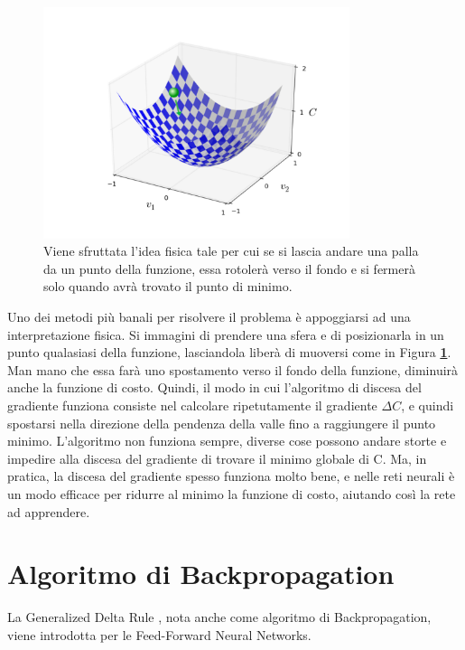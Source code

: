 \begin{figure}
\includegraphics[width=%
0.8\textwidth]{figures/valley_with_ball}
\caption[Funzione a forma di "valle": Idea di minimizzazione]{Viene sfruttata l'idea fisica tale per cui se si lascia andare una palla da un punto della funzione, essa rotolerà verso il fondo e si fermerà solo quando avrà trovato il punto di minimo.
\label{fig:vallepalla}}
\end{figure} 

Uno dei metodi più banali per risolvere il problema è appoggiarsi ad una interpretazione fisica. Si immagini di prendere una sfera e di posizionarla in un punto qualasiasi della funzione, lasciandola liberà di muoversi come in Figura \textbf{\ref{fig:vallepalla}}. Man mano che essa farà uno spostamento verso il fondo della funzione, diminuirà anche la funzione di costo.
Quindi, il modo in cui l'algoritmo di discesa del gradiente funziona consiste nel calcolare ripetutamente il gradiente $\Delta C$, e quindi spostarsi nella direzione della pendenza della valle fino a raggiungere il punto minimo.
L'algoritmo non funziona sempre, diverse cose possono andare storte e impedire alla discesa del gradiente di trovare il minimo globale di C. Ma, in pratica, la discesa del gradiente spesso funziona molto bene, e nelle reti neurali è un modo efficace per ridurre al minimo la funzione di costo, aiutando così la rete ad apprendere.

\section{Algoritmo di Backpropagation}\label{sectionbackpropagation}
La Generalized Delta Rule \cite{rhw86}, nota anche come algoritmo di Backpropagation, viene introdotta per le Feed-Forward Neural Networks.

